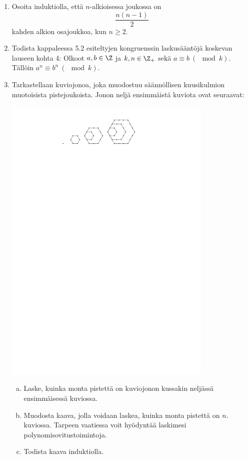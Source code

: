 \begin{enumerate}
\item
Osoita induktiolla, että $n$-alkioisessa joukossa on
\[
\frac{n(n-1)}{2}
\]
kahden alkion osajoukkoa, kun $n \ge 2$.

\newpage
\item Todista kappaleessa 5.2 esiteltyjen kongruenssin laskusääntöjä koskevan lauseen kohta 4: Olkoot $a, b \in \Z$ ja $k, n \in \Z_+$ sekä $a \equiv b\ (\mod k)$. Tällöin $a^n \equiv b^n\ (\mod k)$.

\item Tarkastellaan kuviojonoa, joka muodostuu säännöllisen kuusikulmion muotoisista pistejoukoista. Jonon neljä ensimmäistä kuviota ovat seuraavat:

\begin{center}
\includegraphics[width=10cm]{pictures/Kappale5_4_kuusikulm_v2}
\end{center}


\begin{enumerate}[a)]
\item Laske, kuinka monta pistettä on kuviojonon kussakin neljässä ensimmäisessä kuviossa.
\item Muodosta kaava, jolla voidaan laskea, kuinka monta pistettä on $n$. kuviossa. Tarpeen vaatiessa voit hyödyntää laskimesi polynomisovitustoimintoja.
\item Todista kaava induktiolla.
\end{enumerate}

\end{enumerate}

